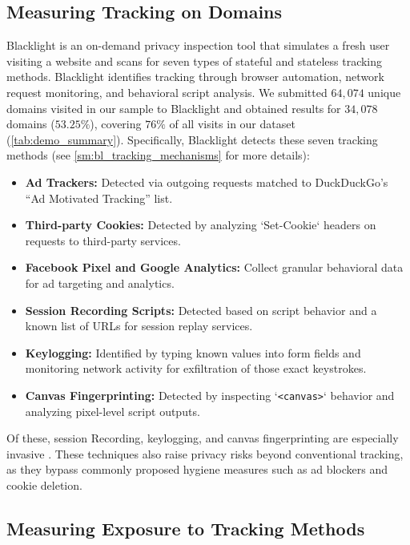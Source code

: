 \documentclass[12pt, letterpaper]{article}
\begin{document}
\subsection{Measuring Tracking on Domains}
\label{sec:blacklight}
Blacklight is an on-demand privacy inspection tool that simulates a fresh user visiting a website and scans for seven types of stateful and stateless tracking methods. Blacklight identifies tracking through browser automation, network request monitoring, and behavioral script analysis. We submitted $64{,}074$ unique domains visited in our sample to Blacklight and obtained results for $34{,}078$ domains ($53.25\%$), covering $76\%$ of all visits in our dataset (\cref{tab:demo_summary}). Specifically, Blacklight detects these seven tracking methods (see \cref{sm:bl_tracking_mechanisms} for more details):
\begin{itemize}\itemsep0pt
    \footnotesize
    \item \textbf{Ad Trackers:} Detected via outgoing requests matched to DuckDuckGo’s ``Ad Motivated Tracking'' list.
    \item \textbf{Third-party Cookies:} Detected by analyzing `Set-Cookie` headers on requests to third-party services.
    \item \textbf{Facebook Pixel and Google Analytics:} Collect granular behavioral data for ad targeting and analytics.
    \item \textbf{Session Recording Scripts:} Detected based on script behavior and a known list of URLs for session replay services.
    \item \textbf{Keylogging:} Identified by typing known values into form fields and monitoring network activity for exfiltration of those exact keystrokes.
    \item \textbf{Canvas Fingerprinting:} Detected by inspecting `\texttt{<canvas>}` behavior and analyzing pixel-level script outputs.
\end{itemize}

Of these, session Recording, keylogging, and canvas fingerprinting are especially invasive \citep{Acar2014, karaj2018whotracks, blacklight, MS12, leakyforms}. These techniques also raise privacy risks beyond conventional tracking, as they bypass commonly proposed hygiene measures such as ad blockers and cookie deletion.

\subsection{Measuring Exposure to Tracking Methods}
\label{sec:measuring_exposure}
\end{document}
